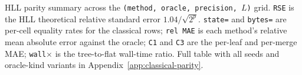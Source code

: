 \begin{table}[t]
    \centering
    \small
    
    \caption{HLL parity summary across the \texttt{(method, oracle, precision, $L$)} grid. \texttt{RSE} is the HLL theoretical relative standard error $1.04/\sqrt{2^p}$. \texttt{state=} and \texttt{bytes=} are per-cell equality rates for the classical rows; \texttt{rel MAE} is each method's relative mean absolute error against the oracle; \texttt{C1} and \texttt{C3} are the per-leaf and per-merge MAE; \texttt{wall$\times$} is the tree-to-flat wall-time ratio. Full table with all seeds and oracle-kind variants in Appendix~\ref{app:classical-parity}.}
    \label{tab:classical-parity-hll}
\end{table}

